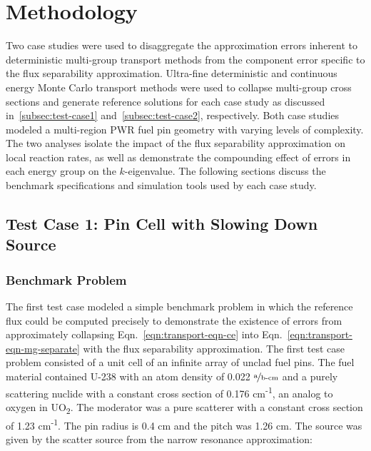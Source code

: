 \section{Methodology}
\label{sec:methodology}

Two case studies were used to disaggregate the approximation errors inherent to deterministic multi-group transport methods from the component error specific to the flux separability approximation. Ultra-fine deterministic and continuous energy Monte Carlo transport methods were used to collapse multi-group cross sections and generate reference solutions for each case study as discussed in~\autoref{subsec:test-case1} and~\autoref{subsec:test-case2}, respectively. Both case studies modeled a multi-region PWR fuel pin geometry with varying levels of complexity. The two analyses isolate the impact of the flux separability approximation on local reaction rates, as well as demonstrate the compounding effect of errors in each energy group on the $k$-eigenvalue. The following sections discuss the benchmark specifications and simulation tools used by each case study.



\subsection{Test Case 1: Pin Cell with Slowing Down Source}
\label{subsec:test-case1}

\subsubsection{Benchmark Problem}
\label{subsubsec:benchmark-case1}

The first test case modeled a simple benchmark problem in which the reference flux could be computed precisely to demonstrate the existence of errors from approximately collapsing Eqn.~\ref{eqn:transport-eqn-ce} into Eqn.~\ref{eqn:transport-eqn-mg-separate} with the flux separability approximation. The first test case problem consisted of a unit cell of an infinite array of unclad fuel pins. The fuel material contained U-238 with an atom density of 0.022 $\nicefrac{\text{a}}{\text{b-cm}}$ and a purely scattering nuclide with a constant cross section of 0.176 cm\textsuperscript{-1}, an analog to oxygen in UO\textsubscript{2}. The moderator was a pure scatterer with a constant cross section of 1.23 cm\textsuperscript{-1}. The pin radius is 0.4 cm and the pitch was 1.26 cm. The source was given by the scatter source from the narrow resonance approximation:

